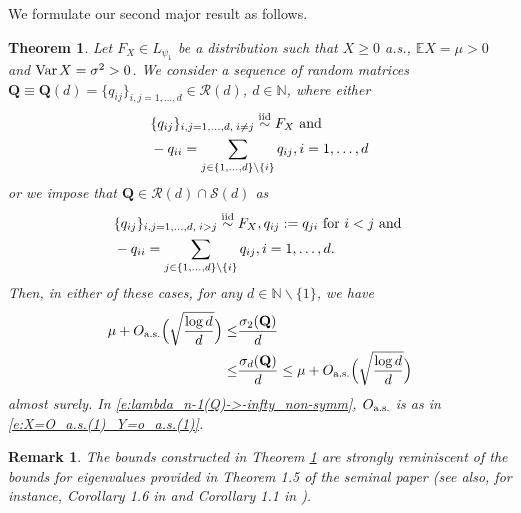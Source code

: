 \documentclass[9pt,twocolumn,twoside]{pnas-new}
\makeatletter
\newcommand{\bbN}{{\mathbb N}}
\newcommand{\bbE}{{\mathbb E}}
\newcommand{\Var}{\textnormal{Var\hspace{0.5mm}}}
\newcommand{\?}{\textbf{?}}
\newcommand{\as}{\textnormal{a.s.}}
\newcommand{\QQ}{\mathbf{Q}}
\newtheorem{@remark}{\bf Remark}
\newenvironment{remark}{\begin{@remark}\rm}{\end{@remark}}
\newtheorem{theorem}{\bf Theorem}
\makeatother
\begin{document}
We formulate our second major result as follows. 
\begin{theorem}\label{t:lambda_n-1(Q)->-infty_non-symm_a.s.}
  Let $F_X \in L_{\psi_1}$ be a distribution such that $X \geq 0$
  a.s., $\bbE X = \mu > 0$ and $\Var X = \sigma^2 > 0$. We consider a
  sequence of random matrices
  $\QQ \equiv \QQ(d) = \{q_{ij}\}_{i,j=1,\hdots,d} \in \mathcal{R}(d)$, $d \in \bbN$,
  where either
  \begin{align}\label{e:RM_theorem_general_condition}
    \begin{aligned}
  &\{q_{ij}\}_{i , j =1, \hdots, d, \hspace{0.75mm}i \neq j}
    \stackrel{\textnormal{iid}}\sim F_X
    \text{ and }\\
  &- q_{ii} = \sum_{j \in \{1,\hdots,d\} \backslash \{i\}}q_{ij},
  i=1,\hdots,d
  \end{aligned}
  \end{align}
  or we impose that $\QQ \in \mathcal{R}(d) \cap \mathcal{S}(d)$ as 
    \begin{align}
    \begin{aligned}\label{e:RM_theorem_symmetry_condition}
  &\{q_{ij}\}_{i , j =1, \hdots, d, \hspace{0.75mm}i > j}
  \stackrel{\textnormal{iid}}\sim F_X,
  q_{ij} := q_{ji} \text{ for } i < j
    \text{ and }\\
  &- q_{ii} = \sum_{j \in \{1,\hdots,d\} \backslash \{i\}}q_{ij},
  i=1,\hdots,d.
  \end{aligned}
\end{align}
    Then, in either of these cases, for any $d \in \bbN \backslash\{1\}$, we have
    \begin{align}
 \mu+ O_{\as}\Big(\sqrt{ \frac{\log d}{d}}\Big) \leq& \frac{\sigma_2(\QQ)}{d} 
 \notag \\
 \leq& \frac{\sigma_d(\QQ)}{d}
 \leq \mu+ O_{\as}\Big(\sqrt{ \frac{\log d}{d}}\Big)
 \label{e:lambda_n-1(Q)->-infty_non-symm}
      \end{align}
      almost surely. In \eqref{e:lambda_n-1(Q)->-infty_non-symm},
      $O_{\textnormal{a.s.}}$ is as in
      \eqref{e:X=O_a.s.(1)_Y=o_a.s.(1)}.
\end{theorem}

\begin{remark}
  The bounds constructed in Theorem
  \ref{t:lambda_n-1(Q)->-infty_non-symm_a.s.} are strongly reminiscent
  of the bounds for eigenvalues provided in Theorem 1.5 of the seminal
  paper \cite{bordenave:caputo:chafai:2014} (see also, for instance,
  Corollary 1.6 in \cite{bryc:dembo:jiang:2006} and Corollary 1.1 in
  \cite{ding:jiang:2010}).
\end{remark}
\end{document}
